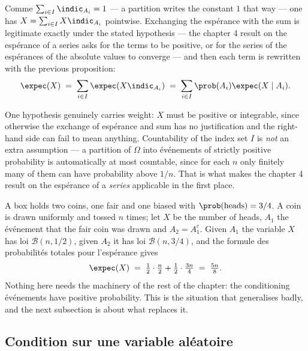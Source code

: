 Comme $\sum_{i \in I} \indic_{A_{i}} = 1$ --- a partition writes the constant $1$
that way --- one has $X = \sum_{i \in I} X \indic_{A_{i}}$ pointwise. Exchanging the
espérance with the sum is legitimate exactly under the stated hypothesis --- the
chapter 4 result on the espérance of a series asks for the terms to be positive, or
for the series of the espérances of the absolute values to converge --- and then
each term is rewritten with the previous proposition:
\[
  \expec(X) \;=\; \sum_{i \in I} \expec(X \indic_{A_{i}})
             \;=\; \sum_{i \in I} \prob(A_{i}) \expec(X \mid A_{i}) .
\]

\begin{remark}
  One hypothesis genuinely carries weight: $X$ must be positive or integrable,
  since otherwise the exchange of espérance and sum has no justification and
  the right-hand side can fail to mean anything. Countability of the index set
  $I$ is \emph{not} an extra assumption --- a partition of $\Omega$ into événements
  of strictly positive probability is automatically at most countable, since for
  each $n$ only finitely many of them can have probability above $1/n$. That is
  what makes the chapter 4 result on the espérance of a \emph{series}
  applicable in the first place.
\end{remark}

\begin{example}
  A box holds two coins, one fair and one biased with $\prob(\text{heads}) = 3/4$.
  A coin is drawn uniformly and tossed $n$ times; let $X$ be the number of heads,
  $A_{1}$ the événement that the fair coin was drawn and $A_{2} = A_{1}^{c}$. Given
  $A_{1}$ the variable $X$ has loi $\mathcal{B}(n,1/2)$, given $A_{2}$ it has loi
  $\mathcal{B}(n,3/4)$, and the formule des probabilités totales pour l'espérance
  gives
  \[
    \expec(X) \;=\; \tfrac{1}{2} \cdot \tfrac{n}{2} + \tfrac{1}{2} \cdot \tfrac{3n}{4}
              \;=\; \tfrac{5n}{8} .
  \]
  Nothing here needs the machinery of the rest of the chapter: the conditioning
  événements have positive probability. This is the situation that generalises badly,
  and the next subsection is about what replaces it.
\end{example}

\subsection{Condition sur une variable aléatoire}

